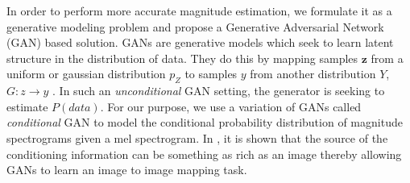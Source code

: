 \documentclass[a4paper]{article}
\begin{document}
In order to perform more accurate magnitude estimation, we formulate it as a generative modeling problem and propose a Generative Adversarial Network (GAN) \cite{goodfellow2014generative} based solution.
GANs are generative models which seek to learn latent structure in the distribution of data. They do this by mapping samples $\bm{z}$ from a uniform or gaussian distribution $p_Z$ to samples $y$ from another distribution $Y$, $G: z\rightarrow y$ \cite{goodfellow2014generative}. 
In such an \textit{unconditional} GAN setting, the generator is seeking to estimate $P(\mathit{data})$. For our purpose, we use a variation of GANs called \textit{conditional} GAN \cite{cGAN} to model the conditional probability distribution of magnitude spectrograms given a mel spectrogram. In \cite{pix2pix}, it is shown that the source of the conditioning information can be something as rich as an image thereby allowing GANs to learn an image to image mapping task. 
\end{document}
